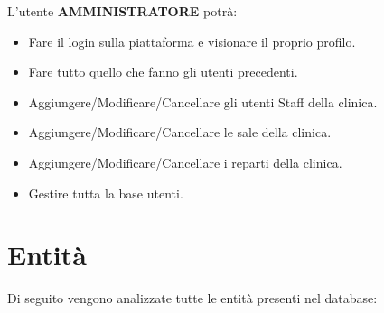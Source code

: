 \documentclass[paper=a4, fontsize=11pt,x11names]{report}
\begin{document}
L'utente \textbf{AMMINISTRATORE} potrà:
\begin{itemize}
\item Fare il login sulla piattaforma e visionare il proprio profilo.
\item Fare tutto quello che fanno gli utenti precedenti.
\item Aggiungere/Modificare/Cancellare gli utenti Staff della clinica.
\item Aggiungere/Modificare/Cancellare le sale della clinica.
\item Aggiungere/Modificare/Cancellare i reparti della clinica.
\item Gestire tutta la base utenti.
\end{itemize}

\newpage
\section{Entità}
Di seguito vengono analizzate tutte le entità presenti nel database:


\end{document}
